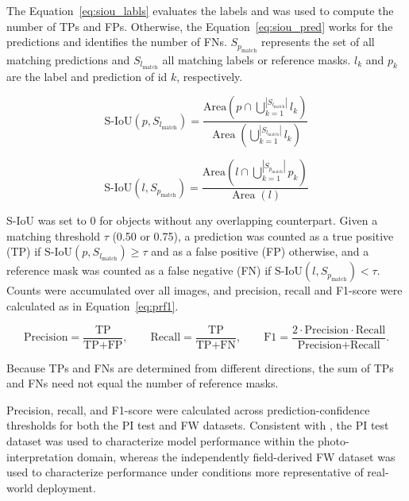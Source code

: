 \documentclass[12pt,a4paper]{article}
\begin{document}
The Equation~\ref{eq:siou_labls} evaluates the labels and was used to compute the number of TPs and FPs. Otherwise, the Equation~\ref{eq:siou_pred} works for the predictions and identifies the number of FNs. $S_{p_{\mathrm{match}}}$ represents the set of all matching predictions and $S_{l_{\mathrm{match}}}$ all matching labels or reference masks. $l_k$ and $p_k$ are the label and prediction of id $k$, respectively.

\begin{equation}
\text{S-IoU}(p, S_{l_{\mathrm{match}}}) = \frac{
    \mathrm{Area}(p \cap \bigcup_{k=1}^{|S_{l_{\mathrm{match}}}|} l_k)
}{
    \operatorname{Area}(\bigcup_{k=1}^{|S_{l_{\mathrm{match}}}|} l_k)
}
\label{eq:siou_labls}
\end{equation}

\begin{equation}
\text{S-IoU}(l, S_{p_{\mathrm{match}}}) = \frac{
    \mathrm{Area}(l \cap \bigcup_{k=1}^{|S_{p_{\mathrm{match}}}|} p_k)
}{
    \operatorname{Area}(l)
}
\label{eq:siou_pred}
\end{equation}

S-IoU was set to 0 for objects without any overlapping counterpart. Given a matching threshold $\tau$ (0.50 or 0.75), a prediction was counted as a true positive (TP) if $\text{S-IoU}(p, S_{l_{\mathrm{match}}}) \geq \tau$ and as a false positive (FP) otherwise, and a reference mask was counted as a false negative (FN) if $\text{S-IoU}(l, S_{p_{\mathrm{match}}}) < \tau$. Counts were accumulated over all images, and precision, recall and F1-score were calculated as in Equation~\ref{eq:prf1}.

\begin{equation}
    \text{Precision} = \frac{\text{TP}}{\text{TP} + \text{FP}},
    \qquad
    \text{Recall} = \frac{\text{TP}}{\text{TP} + \text{FN}},
    \qquad
    \text{F1} = \frac{2 \cdot \text{Precision} \cdot \text{Recall}}{\text{Precision} + \text{Recall}} .
    \label{eq:prf1}
\end{equation}

Because TPs and FNs are determined from different directions, the sum of TPs and FNs need not equal the number of reference masks.

Precision, recall, and F1-score were calculated across prediction-confidence thresholds for both the PI test and FW datasets. Consistent with \citet{khaldi2024individual}, the PI test dataset was used to characterize model performance within the photo-interpretation domain, whereas the independently field-derived FW dataset was used to characterize performance under conditions more representative of real-world deployment.
\end{document}
